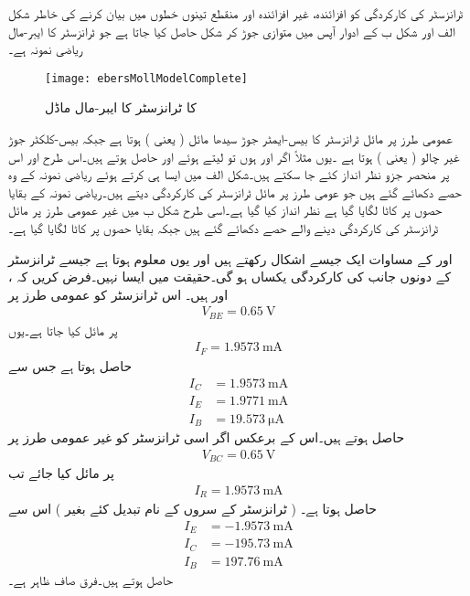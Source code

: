  ٹرانزسٹر کی کارکردگی کو افزائندہ، غیر افزائندہ اور منقطع تینوں خطوں میں بیان کرنے کی خاطر شکل  الف اور شکل  ب  کے ادوار آپس میں متوازی جوڑ کر شکل   حاصل کیا جاتا ہے جو  ٹرانزسٹر کا ایبر-مال ریاضی نمونہ  ہے۔
\begin{figure}
\centering
\texttt{[image: ebersMollModelComplete]}
\caption{ کا ٹرانزسٹر کا ایبر-مال ماڈل}
\label{شکل_مکمل_ایبر_مال_ماڈل}
\end{figure}
عمومی طرز پر مائل ٹرانزسٹر کا بیس-ایمٹر  جوڑ سیدھا مائل ( یعنی ) ہوتا ہے جبکہ بیس-کلکٹر جوڑ غیر چالو ( یعنی ) ہوتا ہے ۔یوں مثلاً اگر  اور  ہوں تو   لیتے ہوئے  اور  حاصل ہوتے ہیں۔اس طرح  اور اس پر منحصر جزو نظر انداز کئے جا سکتے ہیں۔شکل  الف میں ایسا ہی کرتے ہوئے ریاضی نمونہ  کے وہ حصے دکھائے گئے ہیں جو عومی طرز پر مائل  ٹرانزسٹر کی کارکردگی دیتے ہیں۔ریاضی نمونہ  کے بقایا حصوں پر کاٹا لگایا گیا ہے نظر انداز کیا گیا ہے۔اسی طرح شکل  ب میں غیر عمومی طرز پر مائل ٹرانزسٹر کی کارکردگی دینے والے حصے دکھائے گئے ہیں جبکہ بقایا حصوں پر کاٹا لگایا گیا ہے۔

اور  کے مساوات ایک جیسے  اشکال رکھتے ہیں اور یوں معلوم ہوتا ہے جیسے ٹرانزسٹر کے دونوں جانب کی کارکردگی یکساں ہو گی۔حقیقت میں ایسا نہیں۔فرض کریں کہ ،  اور  ہیں۔ اس ٹرانزسٹر کو عمومی طرز پر
\begin{align*}
V_{BE}=\SI{0.65}{\volt}
\end{align*}
پر مائل کیا جاتا ہے۔یوں
\begin{align*}
I_F=\SI{1.9573}{\milli \ampere}
\end{align*}
 حاصل ہوتا ہے جس سے
\begin{align*}
I_C &=\SI{1.9573}{\milli \ampere}\\
I_E&=\SI{1.9771}{\milli \ampere}\\
I_B&=\SI{19.573}{\micro \ampere}
\end{align*}
حاصل ہوتے ہیں۔اس کے برعکس اگر اسی ٹرانزسٹر کو غیر عمومی طرز پر
\begin{align*}
V_{BC}=\SI{0.65}{\volt}
\end{align*}
پر مائل کیا جائے تب 
\begin{align*}
I_R=\SI{1.9573}{\milli \ampere}
\end{align*}
حاصل ہوتا ہے۔ ( ٹرانزسٹر کے سروں کے نام تبدیل کئے بغیر ) اس سے
\begin{align*}
I_E&=\SI{-1.9573}{\milli \ampere}\\
I_C&=\SI{-195.73}{\milli \ampere} \\
I_B&=\SI{197.76}{\milli \ampere}
\end{align*}
حاصل ہوتے ہیں۔فرق صاف ظاہر ہے۔

